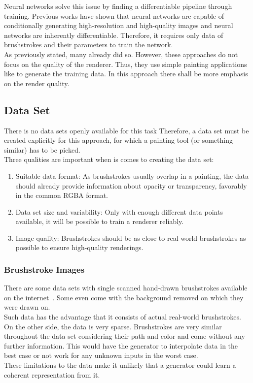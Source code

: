 Neural networks solve this issue by finding a differentiable pipeline through training.
Previous works have shown that neural networks are capable of conditionally generating high-resolution and high-quality images and neural networks are inherently differentiable.
Therefore, it requires only data of brushstrokes and their parameters to train the network.\\
As previously stated, many already did so.
However, these approaches do not focus on the quality of the renderer.
Thus, they use simple painting applications like  to generate the training data.
In this approach there shall be more emphasis on the render quality.

\subsection{Data Set}
There is no data sets openly available for this task
Therefore, a data set must be created explicitly for this approach, for which a painting tool (or something similar) has to be picked.\\
Three qualities are important when is comes to creating the data set:
\begin{enumerate}
    \item Suitable data format: As brushstrokes usually overlap in a painting, the data should already provide information about opacity or transparency, favorably in the common RGBA format.
    \item Data set size and variability: Only with enough different data points available, it will be possible to train a renderer reliably.
    \item Image quality: Brushstrokes should be as close to real-world brushstrokes as possible to ensure high-quality renderings.
\end{enumerate}

\subsubsection{Brushstroke Images}
There are some data sets with single scanned hand-drawn brushstrokes available on the internet~\cite{zolee}.
Some even come with the background removed on which they were drawn on.\\
Such data has the advantage that it consists of actual real-world brushstrokes.
On the other side, the data is very sparse.
Brushstrokes are very similar throughout the data set considering their path and color and come without any further information.
This would have the generator to interpolate data in the best case or not work for any unknown inputs in the worst case.\\
These limitations to the data make it unlikely that a generator could learn a coherent representation from it.

